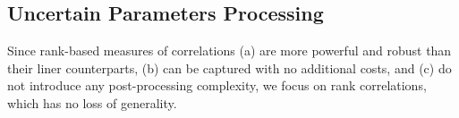 \subsection{Uncertain Parameters Processing}
Since rank-based measures of correlations (a) are more powerful and robust than their liner counterparts, (b) can be captured with no additional costs, and (c) do not introduce any post-processing complexity, we focus on rank correlations, which has no loss of generality.
